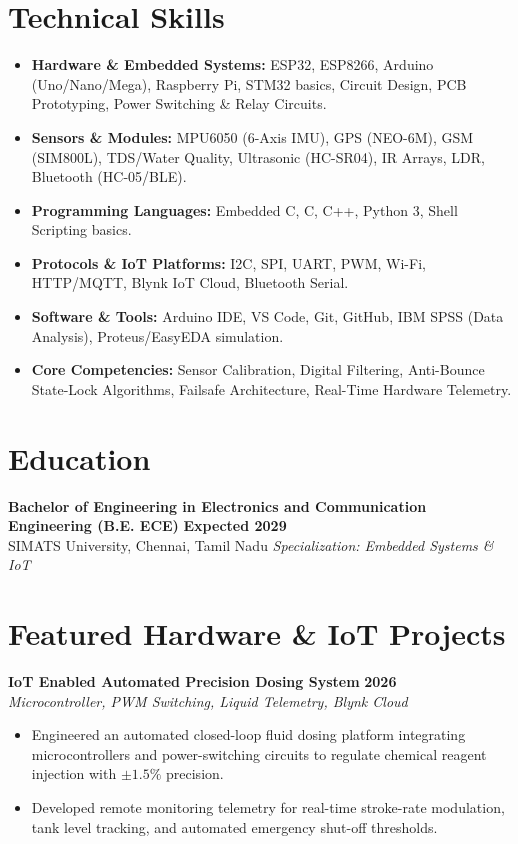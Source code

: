 \documentclass[a4paper,10pt]{article}
\begin{document}
\section{Technical Skills}
\begin{itemize}
    \item \textbf{Hardware \& Embedded Systems:} ESP32, ESP8266, Arduino (Uno/Nano/Mega), Raspberry Pi, STM32 basics, Circuit Design, PCB Prototyping, Power Switching \& Relay Circuits.
    \item \textbf{Sensors \& Modules:} MPU6050 (6-Axis IMU), GPS (NEO-6M), GSM (SIM800L), TDS/Water Quality, Ultrasonic (HC-SR04), IR Arrays, LDR, Bluetooth (HC-05/BLE).
    \item \textbf{Programming Languages:} Embedded C, C, C++, Python 3, Shell Scripting basics.
    \item \textbf{Protocols \& IoT Platforms:} I2C, SPI, UART, PWM, Wi-Fi, HTTP/MQTT, Blynk IoT Cloud, Bluetooth Serial.
    \item \textbf{Software \& Tools:} Arduino IDE, VS Code, Git, GitHub, IBM SPSS (Data Analysis), Proteus/EasyEDA simulation.
    \item \textbf{Core Competencies:} Sensor Calibration, Digital Filtering, Anti-Bounce State-Lock Algorithms, Failsafe Architecture, Real-Time Hardware Telemetry.
\end{itemize}

\section{Education}
\noindent
\textbf{Bachelor of Engineering in Electronics and Communication Engineering (B.E. ECE)} \hfill \textbf{Expected 2029} \\
SIMATS University, Chennai, Tamil Nadu \hfill \textit{Specialization: Embedded Systems \& IoT}

\section{Featured Hardware \& IoT Projects}

\noindent
\textbf{IoT Enabled Automated Precision Dosing System} \hfill \textbf{2026} \\
\textit{Microcontroller, PWM Switching, Liquid Telemetry, Blynk Cloud}
\begin{itemize}
    \item Engineered an automated closed-loop fluid dosing platform integrating microcontrollers and power-switching circuits to regulate chemical reagent injection with $\pm1.5\%$ precision.
    \item Developed remote monitoring telemetry for real-time stroke-rate modulation, tank level tracking, and automated emergency shut-off thresholds.
\end{itemize}
\end{document}
